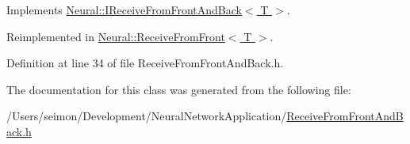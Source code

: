 Implements \hyperlink{class_neural_1_1_i_receive_from_front_and_back_afa3a6ff397a94056669e42184f6ada33}{Neural::IReceiveFromFrontAndBack$<$ T $>$}.



Reimplemented in \hyperlink{class_neural_1_1_receive_from_front_aa460db39ebf7cb6858ce070e9f988174}{Neural::ReceiveFromFront$<$ T $>$}.



Definition at line 34 of file ReceiveFromFrontAndBack.h.



The documentation for this class was generated from the following file:\begin{DoxyCompactItemize}
\item 
/Users/seimon/Development/NeuralNetworkApplication/\hyperlink{_receive_from_front_and_back_8h}{ReceiveFromFrontAndBack.h}\end{DoxyCompactItemize}
